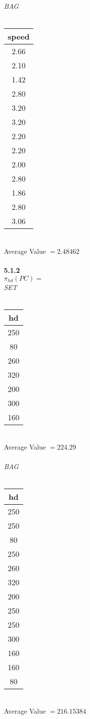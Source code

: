 \documentclass[12pt, letterpaper, fleqn]{article}
\begin{document}
  \textit{BAG} \\\\
  \begin{tabular} { |c|}
    \hline
    speed\\ \hline
    2.66 \\
    2.10 \\
    1.42 \\
    2.80 \\
    3.20 \\
    3.20 \\
    2.20 \\
    2.20 \\
    2.00 \\
    2.80 \\
    1.86 \\
    2.80 \\
    3.06  \\
    \hline
  \end{tabular} \\
  Average Value $= 2.48462$ \\\\

  \textbf{5.1.2} \\
  $\pi_{hd}(PC) = $ \\
  \textit{SET}\\\\
  \begin{tabular} { | c|}
    \hline
    hd\\ \hline
    250 \\
    80 \\
    260 \\
    320 \\
    200 \\
    300 \\
    160 \\
    \hline
  \end{tabular} \\
  Average Value $= 224.29$ \\\\

  \textit{BAG} \\\\
  \begin{tabular} { |c|}
    \hline
    hd\\ \hline
    250 \\
    250 \\
    80 \\
    250 \\
    260 \\
    320 \\
    200 \\
    250 \\
    250 \\
    300 \\
    160 \\
    160 \\
    80  \\
    \hline
  \end{tabular} \\
  Average Value $= 216.15384$\\\\
\end{document}
